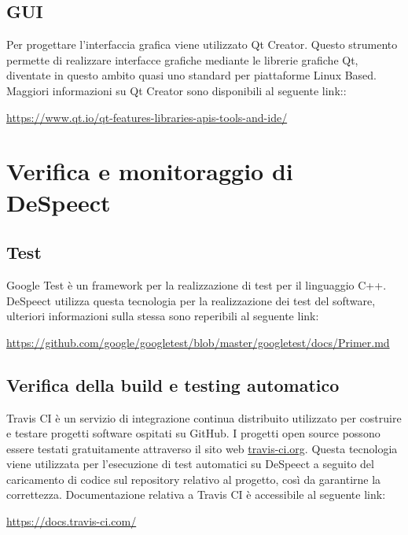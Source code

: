 \documentclass[openany,12pt,a4paper]{report}
\begin{document}
	\subsection{GUI}
	
	Per progettare l'interfaccia grafica viene utilizzato \Gls{Qt Creator}. Questo strumento permette di realizzare interfacce grafiche mediante le librerie grafiche Qt, diventate in questo ambito quasi uno standard per piattaforme Linux Based.  Maggiori informazioni su Qt Creator sono disponibili al seguente link:: 
	\begin{center}
	\centerline{\url{https://www.qt.io/qt-features-libraries-apis-tools-and-ide/}}
	\end{center}

	
	\section{Verifica e monitoraggio di DeSpeect}	
	
	\subsection{Test}
	Google Test è un framework per la realizzazione di test per il linguaggio C++. DeSpeect utilizza questa tecnologia per la realizzazione dei test del software, ulteriori informazioni sulla stessa sono reperibili al seguente link:
	\begin{center}
		\url{https://github.com/google/googletest/blob/master/googletest/docs/Primer.md}
	\end{center}

	\subsection{Verifica della build e testing automatico}
	Travis CI è un servizio di integrazione continua distribuito utilizzato per costruire e testare progetti software ospitati su \Gls{GitHub}. I progetti open source possono essere testati gratuitamente attraverso il sito web \url{travis-ci.org}. Questa tecnologia viene utilizzata per l'esecuzione di test automatici su DeSpeect a seguito del caricamento di codice sul repository relativo al progetto, così da garantirne la correttezza. Documentazione relativa a Travis CI è accessibile al seguente link:
	\begin{center}
		\url{https://docs.travis-ci.com/}
	\end{center}
	
\end{document}
